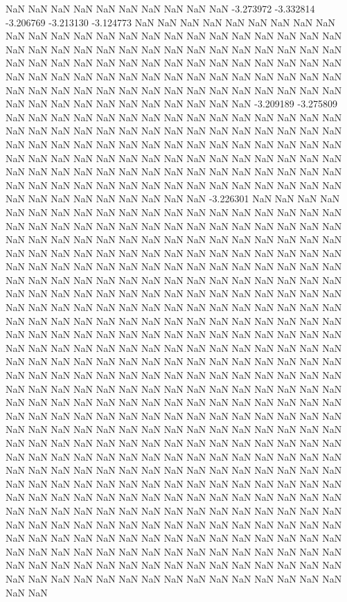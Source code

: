NaN
NaN
NaN
NaN
NaN
NaN
NaN
NaN
NaN
NaN
-3.273972
-3.332814
-3.206769
-3.213130
-3.124773
NaN
NaN
NaN
NaN
NaN
NaN
NaN
NaN
NaN
NaN
NaN
NaN
NaN
NaN
NaN
NaN
NaN
NaN
NaN
NaN
NaN
NaN
NaN
NaN
NaN
NaN
NaN
NaN
NaN
NaN
NaN
NaN
NaN
NaN
NaN
NaN
NaN
NaN
NaN
NaN
NaN
NaN
NaN
NaN
NaN
NaN
NaN
NaN
NaN
NaN
NaN
NaN
NaN
NaN
NaN
NaN
NaN
NaN
NaN
NaN
NaN
NaN
NaN
NaN
NaN
NaN
NaN
NaN
NaN
NaN
NaN
NaN
NaN
NaN
NaN
NaN
NaN
NaN
NaN
NaN
NaN
NaN
NaN
NaN
NaN
NaN
NaN
NaN
NaN
NaN
NaN
NaN
NaN
NaN
NaN
-3.209189
-3.275809
NaN
NaN
NaN
NaN
NaN
NaN
NaN
NaN
NaN
NaN
NaN
NaN
NaN
NaN
NaN
NaN
NaN
NaN
NaN
NaN
NaN
NaN
NaN
NaN
NaN
NaN
NaN
NaN
NaN
NaN
NaN
NaN
NaN
NaN
NaN
NaN
NaN
NaN
NaN
NaN
NaN
NaN
NaN
NaN
NaN
NaN
NaN
NaN
NaN
NaN
NaN
NaN
NaN
NaN
NaN
NaN
NaN
NaN
NaN
NaN
NaN
NaN
NaN
NaN
NaN
NaN
NaN
NaN
NaN
NaN
NaN
NaN
NaN
NaN
NaN
NaN
NaN
NaN
NaN
NaN
NaN
NaN
NaN
NaN
NaN
NaN
NaN
NaN
NaN
NaN
NaN
NaN
NaN
NaN
NaN
NaN
NaN
NaN
NaN
-3.226301
NaN
NaN
NaN
NaN
NaN
NaN
NaN
NaN
NaN
NaN
NaN
NaN
NaN
NaN
NaN
NaN
NaN
NaN
NaN
NaN
NaN
NaN
NaN
NaN
NaN
NaN
NaN
NaN
NaN
NaN
NaN
NaN
NaN
NaN
NaN
NaN
NaN
NaN
NaN
NaN
NaN
NaN
NaN
NaN
NaN
NaN
NaN
NaN
NaN
NaN
NaN
NaN
NaN
NaN
NaN
NaN
NaN
NaN
NaN
NaN
NaN
NaN
NaN
NaN
NaN
NaN
NaN
NaN
NaN
NaN
NaN
NaN
NaN
NaN
NaN
NaN
NaN
NaN
NaN
NaN
NaN
NaN
NaN
NaN
NaN
NaN
NaN
NaN
NaN
NaN
NaN
NaN
NaN
NaN
NaN
NaN
NaN
NaN
NaN
NaN
NaN
NaN
NaN
NaN
NaN
NaN
NaN
NaN
NaN
NaN
NaN
NaN
NaN
NaN
NaN
NaN
NaN
NaN
NaN
NaN
NaN
NaN
NaN
NaN
NaN
NaN
NaN
NaN
NaN
NaN
NaN
NaN
NaN
NaN
NaN
NaN
NaN
NaN
NaN
NaN
NaN
NaN
NaN
NaN
NaN
NaN
NaN
NaN
NaN
NaN
NaN
NaN
NaN
NaN
NaN
NaN
NaN
NaN
NaN
NaN
NaN
NaN
NaN
NaN
NaN
NaN
NaN
NaN
NaN
NaN
NaN
NaN
NaN
NaN
NaN
NaN
NaN
NaN
NaN
NaN
NaN
NaN
NaN
NaN
NaN
NaN
NaN
NaN
NaN
NaN
NaN
NaN
NaN
NaN
NaN
NaN
NaN
NaN
NaN
NaN
NaN
NaN
NaN
NaN
NaN
NaN
NaN
NaN
NaN
NaN
NaN
NaN
NaN
NaN
NaN
NaN
NaN
NaN
NaN
NaN
NaN
NaN
NaN
NaN
NaN
NaN
NaN
NaN
NaN
NaN
NaN
NaN
NaN
NaN
NaN
NaN
NaN
NaN
NaN
NaN
NaN
NaN
NaN
NaN
NaN
NaN
NaN
NaN
NaN
NaN
NaN
NaN
NaN
NaN
NaN
NaN
NaN
NaN
NaN
NaN
NaN
NaN
NaN
NaN
NaN
NaN
NaN
NaN
NaN
NaN
NaN
NaN
NaN
NaN
NaN
NaN
NaN
NaN
NaN
NaN
NaN
NaN
NaN
NaN
NaN
NaN
NaN
NaN
NaN
NaN
NaN
NaN
NaN
NaN
NaN
NaN
NaN
NaN
NaN
NaN
NaN
NaN
NaN
NaN
NaN
NaN
NaN
NaN
NaN
NaN
NaN
NaN
NaN
NaN
NaN
NaN
NaN
NaN
NaN
NaN
NaN
NaN
NaN
NaN
NaN
NaN
NaN
NaN
NaN
NaN
NaN
NaN
NaN
NaN
NaN
NaN
NaN
NaN
NaN
NaN
NaN
NaN
NaN
NaN
NaN
NaN
NaN
NaN
NaN
NaN
NaN
NaN
NaN
NaN
NaN
NaN
NaN
NaN
NaN
NaN
NaN
NaN
NaN
NaN
NaN
NaN
NaN
NaN
NaN
NaN
NaN
NaN
NaN
NaN
NaN
NaN
NaN
NaN
NaN
NaN
NaN
NaN
NaN
NaN
NaN
NaN
NaN
NaN
NaN
NaN
NaN
NaN
NaN
NaN
NaN
NaN
NaN
NaN
NaN
NaN
NaN
NaN
NaN
NaN
NaN
NaN
NaN
NaN
NaN
NaN
NaN
NaN
NaN
NaN
NaN
NaN
NaN
NaN
NaN
NaN
NaN
NaN
NaN
NaN
NaN
NaN
